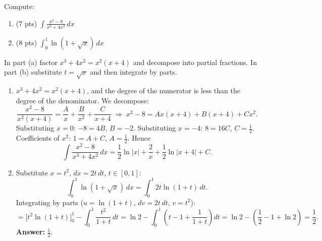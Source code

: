
\begin{question}
Compute:
\begin{enumerate}
  \item[a.] (7 pts) $\displaystyle\int\frac{x^2-8}{x^3+4x^2}\,dx$
  \item[b.] (8 pts) $\displaystyle\int_0^1\ln(1+\sqrt x)\,dx$
\end{enumerate}
\end{question}

\begin{hint}
In part (a) factor $x^3+4x^2=x^2(x+4)$ and decompose into partial fractions. In part (b) substitute $t=\sqrt x$ and then integrate by parts.
\end{hint}

\begin{solution}
\begin{enumerate}
  \item[a.] $x^3+4x^2=x^2(x+4)$, and the degree of the numerator is less than the degree of the denominator. We decompose:
  \[ \frac{x^2-8}{x^2(x+4)}=\frac Ax+\frac B{x^2}+\frac C{x+4}\;\Longrightarrow\;x^2-8=Ax(x+4)+B(x+4)+Cx^2. \]
  Substituting $x=0$: $-8=4B$, $B=-2$. Substituting $x=-4$: $8=16C$, $C=\frac12$. Coefficients of $x^2$: $1=A+C$, $A=\frac12$. Hence
  \[ \int\frac{x^2-8}{x^3+4x^2}\,dx=\frac12\ln|x|+\frac2x+\frac12\ln|x+4|+C. \]
  \item[b.] Substitute $x=t^2$, $dx=2t\,dt$, $t\in[0,1]$:
  \[ \int_0^1\ln(1+\sqrt x)\,dx=\int_0^1 2t\ln(1+t)\,dt. \]
  Integrating by parts ($u=\ln(1+t)$, $dv=2t\,dt$, $v=t^2$):
  \[ =\Big[t^2\ln(1+t)\Big]_0^1-\int_0^1\frac{t^2}{1+t}\,dt=\ln2-\int_0^1\left(t-1+\frac1{1+t}\right)dt=\ln2-\left(\frac12-1+\ln2\right)=\frac12. \]
  \textbf{Answer:} $\frac12$.
\end{enumerate}
\end{solution}
